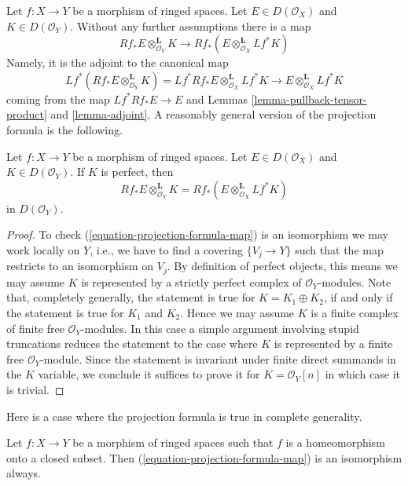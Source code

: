 \noindent
Let $f : X \to Y$ be a morphism of ringed spaces. 
Let $E \in D(\mathcal{O}_X)$ and $K \in D(\mathcal{O}_Y)$.
Without any further assumptions there is a map
\begin{equation}
\label{equation-projection-formula-map}
Rf_*E \otimes^\mathbf{L}_{\mathcal{O}_Y} K
\longrightarrow
Rf_*(E \otimes^\mathbf{L}_{\mathcal{O}_X} Lf^*K)
\end{equation}
Namely, it is the adjoint to the canonical map
$$
Lf^*(Rf_*E \otimes^\mathbf{L}_{\mathcal{O}_Y} K) =
Lf^*Rf_*E \otimes^\mathbf{L}_{\mathcal{O}_X} Lf^*K
\longrightarrow
E \otimes^\mathbf{L}_{\mathcal{O}_X} Lf^*K
$$
coming from the map $Lf^*Rf_*E \to E$ and Lemmas
\ref{lemma-pullback-tensor-product} and \ref{lemma-adjoint}.
A reasonably general version of the projection formula is the following.

\begin{lemma}
\label{lemma-projection-formula-perfect}
Let $f : X \to Y$ be a morphism of ringed spaces.
Let $E \in D(\mathcal{O}_X)$ and $K \in D(\mathcal{O}_Y)$.
If $K$ is perfect, then
$$
Rf_*E \otimes^\mathbf{L}_{\mathcal{O}_Y} K =
Rf_*(E \otimes^\mathbf{L}_{\mathcal{O}_X} Lf^*K)
$$
in $D(\mathcal{O}_Y)$.
\end{lemma}

\begin{proof}
To check (\ref{equation-projection-formula-map}) is an isomorphism
we may work locally on $Y$, i.e., we have to find a covering $\{V_j \to Y\}$
such that the map restricts to an isomorphism on $V_j$. By definition
of perfect objects, this means we may assume $K$ is represented by
a strictly perfect complex of $\mathcal{O}_Y$-modules.
Note that, completely generally, the statement is true for
$K = K_1 \oplus K_2$, if and only if the statement is true for
$K_1$ and $K_2$. Hence we may assume $K$ is a finite
complex of finite free $\mathcal{O}_Y$-modules.
In this case a simple argument involving stupid truncations reduces
the statement to the case where $K$ is represented by a finite
free $\mathcal{O}_Y$-module. Since the statement is invariant
under finite direct summands in the $K$ variable, we conclude
it suffices to prove it for $K = \mathcal{O}_Y[n]$
in which case it is trivial.
\end{proof}

\noindent
Here is a case where the projection formula is true in complete
generality.

\begin{lemma}
\label{lemma-projection-formula-closed-immersion}
Let $f : X \to Y$ be a morphism of ringed spaces such that $f$ is a
homeomorphism onto a closed subset. Then
(\ref{equation-projection-formula-map}) is an isomorphism always.
\end{lemma}

